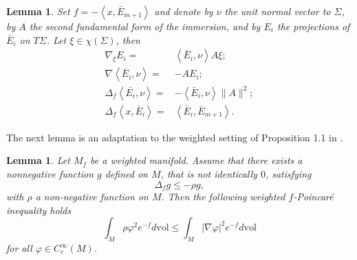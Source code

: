 \documentclass[11pt, leqno]{amsart}
\newtheorem{lemma}[theorem]{Lemma}
\def\<{\left\langle}
\def\>{\right\rangle}
\def\<{\left\langle}
\def\>{\right\rangle}
\begin{document}
\begin{lemma}\label{LemBasEq}
Set $f=-\<x,\bar{E}_{m+1}\>$ and denote by $\nu$ the unit normal vector to $\Sigma$, by $A$ the second fundamental form of the immersion, and by $E_{i}$ the projections of $\bar{E}_{i}$ on $T\Sigma$. Let $\xi\in \chi(\Sigma)$, then 
\begin{align*}
\nabla_{\xi}E_{i}=&\<\bar{E}_{i}, \nu\>A\xi;\\
\nabla\<\bar{E}_{i}, \nu\>=&-AE_{i};\\
\Delta_{f}\<\bar{E_{i}},\nu\>=&-\<\bar{E}_{i}, \nu\>\|A\|^2;\\
\Delta_{f}\<x,\bar{E}_{i}\>=&\<\bar{E}_{i},\bar{E}_{m+1}\>.
\end{align*}
\end{lemma}

The next lemma is an adaptation to the weighted setting of Proposition 1.1 in \cite{LiWang_Poincare}.
\begin{lemma}\label{lemmaweightedpoincare}
Let $M_f$ be a weighted manifold. Assume that there exists a nonnegative function $g$ defined on $M$, that is not identically $0$, satisfying
\[
\Delta_f g\leq -\rho g,
\]
with $\rho$ a non-negative function on $M$. Then the following weighted $f$-Poincar\'e inequality holds
\[
\int_M \rho\varphi^2 e^{-f}d\mathrm{vol}\leq \int_M |\nabla \varphi|^2 e^{-f}d\mathrm{vol}
\]
for all $\varphi\in C^\infty_c(M)$.
\end{lemma}
\end{document}
